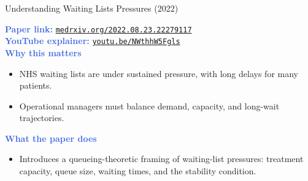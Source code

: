 \documentclass{beamer}
\let\oldtextbf\textbf
\renewcommand{\textbf}[1]{\textcolor{RoyalBlue}{\oldtextbf{#1}}}
\begin{document}
\begin{frame}{Understanding Waiting Lists Pressures (2022)}

  \textbf{Paper link:}  
  \href{https://www.medrxiv.org/content/10.1101/2022.08.23.22279117v1.full}{\texttt{medrxiv.org/2022.08.23.22279117}}
\\
\textbf{YouTube explainer:}
\href{https://youtu.be/NWthhW5Fgls?si=e2LRcd9ymTyQKqrM}{\texttt{youtu.be/NWthhW5Fgls}}
\\
  \vspace{1em}
  \textbf{Why this matters}
  \begin{itemize}
    \item NHS waiting lists are under sustained pressure, with long delays for many patients.
    \item Operational managers must balance demand, capacity, and long-wait trajectories.
  \end{itemize}

  \vspace{1em}
  \textbf{What the paper does}
  \begin{itemize}
    \item Introduces a queueing-theoretic framing of waiting-list pressures:
    treatment capacity, queue size, waiting times, and the
      stability condition.
  \end{itemize}


\end{frame}
\end{document}
